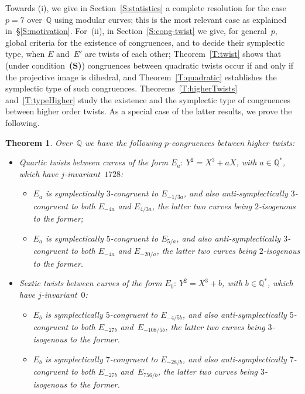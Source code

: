 \documentclass[twoside,leqno,symbols-for-thanks, draft]{rmi}
\numberwithin{equation}{section}
\newcommand{\Q}{\mathbb{Q}}
\newtheorem{theorem}{Theorem}[section]
\theoremstyle{remark}
\begin{document}
Towards (i), we give in Section~\ref{S:statistics} a complete
resolution for the case~$p=7$ over~$\Q$ using modular curves; this is the most relevant case as explained in~\S\ref{S:motivation}.
For~(ii), in
Section~\ref{S:cong-twist} we give, for general~$p$, global criteria
for the existence of congruences, and to decide their symplectic type, when $E$
and~$E'$ are twists of each other; Theorem~\ref{T:twist} shows that
(under condition~{\bf(S)}) congruences between quadratic twists occur if
and only if the projective image is dihedral, and
Theorem~\ref{T:quadratic} establishes the symplectic type of such
congruences. Theorems~\ref{T:higherTwists} and~\ref{T:typeHigher}
study the existence and the symplectic type of congruences between
higher order twists.  As a special case of the latter results, we prove
the following.

\begin{theorem}
\label{T:higherTwistsQ}
Over~$\Q$ we have the following 
$p$-congruences between higher twists:
\begin{itemize}
\item Quartic twists between curves of the form $E_a:\ Y^2=X^3+aX$,
  with $a \in \Q^*$, which have $j$-invariant~$1728$:
  \begin{itemize}
    \item
   $E_a$ is symplectically $3$-congruent to $E_{-1/3a}$, and also
      anti-symplectically $3$-congruent to both $E_{-4a}$ and
      $E_{4/3a}$, the latter two curves being $2$-isogenous to the
      former;
    \item
      $E_a$ is symplectically $5$-congruent to $E_{5/a}$, and also
      anti-symplectically $3$-congruent to both $E_{-4a}$ and
      $E_{-20/a}$, the latter two curves being $2$-isogenous to the
      former.
  \end{itemize}
\item Sextic twists between curves of the form $E_b:\ Y^2=X^3+b$, with
  $b \in \Q^*$, which have $j$-invariant~$0$:
  \begin{itemize}
    \item
      $E_b$ is symplectically $5$-congruent to $E_{-4/5b}$, and also
      anti-symplectically $5$-congruent to both $E_{-27b}$
      and~$E_{-108/5b}$, the latter two curves being $3$-isogenous to
      the former.
    \item
      $E_b$ is symplectically $7$-congruent to $E_{-28/b}$, and also
      anti-symplectically $7$-congruent to both $E_{-27b}$
      and~$E_{756/b}$, the latter two curves being $3$-isogenous to
      the former.
  \end{itemize}
\end{itemize}
\end{theorem}
\end{document}
